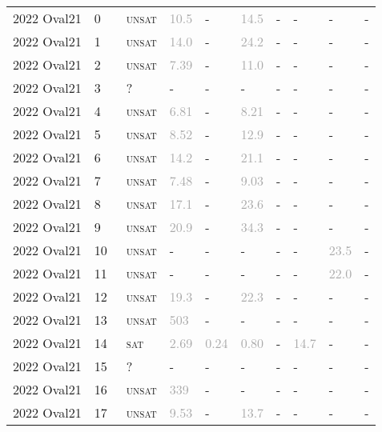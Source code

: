 \begin{center}
{\begin{longtable}{@{}llllllllll@{}}
\midrule
2022 Oval21 & 0 & ~\textsc{unsat} & \textcolor{darkgray}{10.5} & - & \textcolor{darkgray}{14.5} & - & - & - & - \\
2022 Oval21 & 1 & ~\textsc{unsat} & \textcolor{darkgray}{14.0} & - & \textcolor{darkgray}{24.2} & - & - & - & - \\
2022 Oval21 & 2 & ~\textsc{unsat} & \textcolor{darkgray}{7.39} & - & \textcolor{darkgray}{11.0} & - & - & - & - \\
2022 Oval21 & 3 & ~? & - & - & - & - & - & - & - \\
2022 Oval21 & 4 & ~\textsc{unsat} & \textcolor{darkgray}{6.81} & - & \textcolor{darkgray}{8.21} & - & - & - & - \\
2022 Oval21 & 5 & ~\textsc{unsat} & \textcolor{darkgray}{8.52} & - & \textcolor{darkgray}{12.9} & - & - & - & - \\
2022 Oval21 & 6 & ~\textsc{unsat} & \textcolor{darkgray}{14.2} & - & \textcolor{darkgray}{21.1} & - & - & - & - \\
2022 Oval21 & 7 & ~\textsc{unsat} & \textcolor{darkgray}{7.48} & - & \textcolor{darkgray}{9.03} & - & - & - & - \\
2022 Oval21 & 8 & ~\textsc{unsat} & \textcolor{darkgray}{17.1} & - & \textcolor{darkgray}{23.6} & - & - & - & - \\
2022 Oval21 & 9 & ~\textsc{unsat} & \textcolor{darkgray}{20.9} & - & \textcolor{darkgray}{34.3} & - & - & - & - \\
2022 Oval21 & 10 & ~\textsc{unsat} & - & - & - & - & - & \textcolor{darkgray}{23.5} & - \\
2022 Oval21 & 11 & ~\textsc{unsat} & - & - & - & - & - & \textcolor{darkgray}{22.0} & - \\
2022 Oval21 & 12 & ~\textsc{unsat} & \textcolor{darkgray}{19.3} & - & \textcolor{darkgray}{22.3} & - & - & - & - \\
2022 Oval21 & 13 & ~\textsc{unsat} & \textcolor{darkgray}{503} & - & - & - & - & - & - \\
2022 Oval21 & 14 & ~\textsc{sat} & \textcolor{darkgray}{2.69} & \textcolor{darkgray}{0.24} & \textcolor{darkgray}{0.80} & - & \textcolor{darkgray}{14.7} & - & - \\
2022 Oval21 & 15 & ~? & - & - & - & - & - & - & - \\
2022 Oval21 & 16 & ~\textsc{unsat} & \textcolor{darkgray}{339} & - & - & - & - & - & - \\
2022 Oval21 & 17 & ~\textsc{unsat} & \textcolor{darkgray}{9.53} & - & \textcolor{darkgray}{13.7} & - & - & - & - \\

\end{longtable}}
\end{center}
